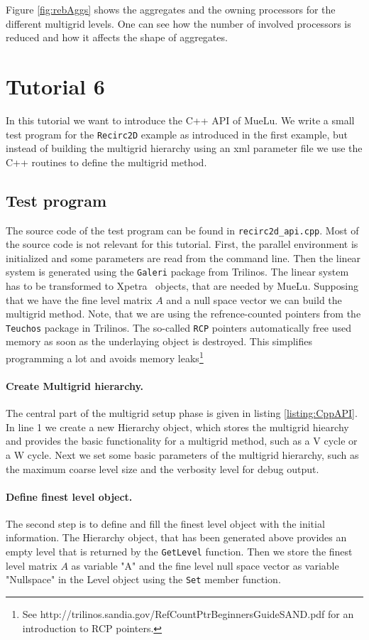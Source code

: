 \documentclass[12pt,a4paper]{article}
\newcommand{\MueLu}{MueLu}
\newcommand{\Xpetra}{Xpetra}
\begin{document}
Figure \ref{fig:rebAggs} shows the aggregates and the owning processors for the different multigrid levels. One can see how the number of involved processors is reduced and how it affects the shape of aggregates.


\section{Tutorial 6}

In this tutorial we want to introduce the C++ API of \MueLu. We write a small test program for the \verb|Recirc2D| example as introduced in the first example, but instead of building the multigrid hierarchy using an xml parameter file we use the C++ routines to define the multigrid method.

\subsection{Test program}
The source code of the test program can be found in \verb|recirc2d_api.cpp|. Most of the source code is not relevant for this tutorial. First, the parallel environment is initialized and some parameters are read from the command line. Then the linear system is generated using the \verb|Galeri| package from Trilinos. The linear system has to be transformed to \Xpetra~ objects, that are needed by \MueLu. Supposing that we have the fine level matrix $A$ and a null space vector we can build the multigrid method.
Note, that we are using the refrence-counted pointers from the \verb|Teuchos| package in Trilinos. The so-called \verb|RCP| pointers automatically free used memory as soon as the underlaying object is destroyed. This simplifies programming a lot and avoids memory leaks\footnote{See http://trilinos.sandia.gov/RefCountPtrBeginnersGuideSAND.pdf for an introduction to RCP pointers.}

\paragraph{Create Multigrid hierarchy.}
The central part of the multigrid setup phase is given in listing \ref{listing:CppAPI}.
In line 1 we create a new Hierarchy object, which stores the multigrid hiearchy and provides the basic functionality for a multigrid method, such as a V cycle or a W cycle. Next we set some basic parameters of the multigrid hierarchy, such as the maximum coarse level size and the verbosity level for debug output.

\paragraph{Define finest level object.}
The second step is to define and fill the finest level object with the initial information. The Hierarchy object, that has been generated above provides an empty level that is returned by the \verb|GetLevel| function. Then we store the finest level matrix $A$ as variable "A" and the fine level null space vector as variable "Nullspace" in the Level object using the \verb|Set| member function.
\end{document}
